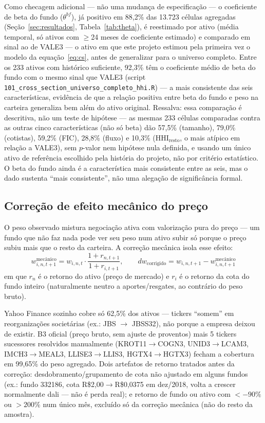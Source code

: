 \documentclass[11pt,a4paper]{article}
\begin{document}
Como checagem adicional --- não uma mudança de especificação --- o coeficiente de beta do fundo
($\theta^{bf}$), já positivo em 88,2\% das 13.723 células agregadas
(Seção~\ref{sec:resultados}, Tabela~\ref{tab:theta}), é reestimado por ativo (média temporal, só
ativos com $\geq$24 meses de coeficiente estimado) e comparado em sinal ao de VALE3 --- o ativo
em que este projeto estimou pela primeira vez o modelo da equação~\eqref{eq:cs}, antes de
generalizar para o universo completo. Entre os 233 ativos com histórico suficiente, 92,3\% têm o
coeficiente médio de beta do fundo com o mesmo sinal que VALE3 (script
\texttt{101\_cross\_section\_universo\_completo\_hhi.R}) --- a mais consistente das seis
características, evidência de que a relação positiva entre beta do fundo e peso na carteira
generaliza bem além do ativo original. Ressalva: essa comparação é descritiva, não um teste de
hipótese --- as mesmas 233 células comparadas contra as outras cinco características (não só
beta) dão 57,5\% (tamanho), 79,0\% (cotistas), 59,2\% (FIC), 28,8\% (fluxo) e 10,3\%
($\text{HHI}_{\text{resto}}$, o mais atípico em relação a VALE3), sem $p$-valor nem hipótese nula
definida, e usando um único ativo de referência escolhido pela história do projeto, não por
critério estatístico. O beta do fundo ainda é a característica mais consistente entre as seis,
mas o dado sustenta ``mais consistente'', não uma alegação de significância formal.

\FloatBarrier
\subsection{Correção de efeito mecânico do preço}

O peso observado mistura negociação ativa com valorização pura do preço --- um fundo que não
faz nada pode ver seu peso num ativo subir só porque o preço subiu mais que o resto da
carteira. A correção mecânica isola esse efeito:
\begin{equation}
w^{\text{mecânico}}_{i,n,t+1} = w_{i,n,t}\cdot\frac{1+r_{n,t+1}}{1+r_{i,t+1}}, \qquad
dw_{\text{corrigido}} = w_{i,n,t+1} - w^{\text{mecânico}}_{i,n,t+1}
\label{eq:mecanico}
\end{equation}
em que $r_n$ é o retorno do ativo (preço de mercado) e $r_i$ é o retorno da cota do fundo
inteiro (naturalmente neutro a aportes/resgates, ao contrário do peso bruto).

Yahoo Finance sozinho cobre só 62,5\% dos ativos --- tickers ``somem'' em reorganizações
societárias (ex.: JBS $\to$ JBSS32), não porque a empresa deixou de existir. B3 oficial (preço
bruto, sem ajuste de proventos) mais 5 tickers sucessores resolvidos manualmente
(KROT11$\to$COGN3, UNID3$\to$LCAM3, IMCH3$\to$MEAL3, LLISE3$\to$LLIS3, HGTX4$\to$HGTX3) fecham
a cobertura em 99,65\% do peso agregado. Dois artefatos de retorno tratados antes da correção:
desdobramento/grupamento de cota não ajustado em alguns fundos (ex.: fundo 332186, cota
R\$2,00$\to$R\$0,0375 em dez/2018, volta a crescer normalmente dali --- não é perda real); e
retorno de fundo ou ativo com $<-90\%$ ou $>200\%$ num único mês, excluído só da correção
mecânica (não do resto da amostra).
\end{document}
